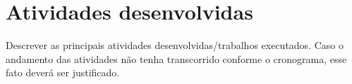 \section{Atividades desenvolvidas}\label{sec:atividades}

Descrever as principais atividades desenvolvidas/trabalhos executados. Caso o andamento das atividades não tenha transcorrido conforme o cronograma, esse fato deverá ser justificado.